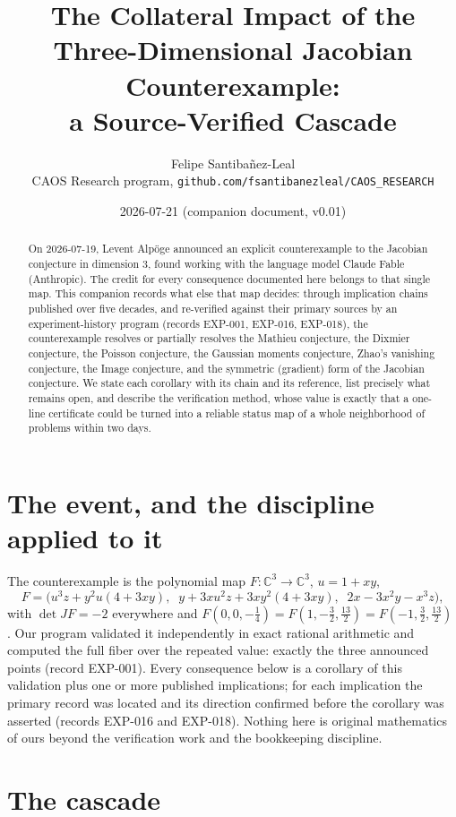 \documentclass[11pt]{article}
\title{The Collateral Impact of the Three-Dimensional Jacobian Counterexample:\\ a Source-Verified Cascade}
\author{Felipe Santiba\~nez-Leal\\
\small CAOS Research program, \texttt{github.com/fsantibanezleal/CAOS\_RESEARCH}}
\date{2026-07-21 (companion document, v0.01)}
\newcommand{\C}{\mathbb{C}}
\begin{document}
\maketitle

\begin{abstract}
On 2026-07-19, Levent Alp\"oge announced an explicit counterexample to the Jacobian conjecture
in dimension 3, found working with the language model Claude Fable (Anthropic). The credit for
every consequence documented here belongs to that single map. This companion records what else
that map decides: through implication chains published over five decades, and re-verified
against their primary sources by an experiment-history program (records EXP-001, EXP-016,
EXP-018), the counterexample resolves or partially resolves the Mathieu conjecture, the Dixmier
conjecture, the Poisson conjecture, the Gaussian moments conjecture, Zhao's vanishing
conjecture, the Image conjecture, and the symmetric (gradient) form of the Jacobian conjecture.
We state each corollary with its chain and its reference, list precisely what remains open, and
describe the verification method, whose value is exactly that a one-line certificate could be
turned into a reliable status map of a whole neighborhood of problems within two days.
\end{abstract}

\section{The event, and the discipline applied to it}

The counterexample is the polynomial map $F : \C^3 \to \C^3$, $u = 1 + xy$,
\[
F = \bigl(u^3 z + y^2 u (4 + 3xy),\;\; y + 3x u^2 z + 3x y^2 (4 + 3xy),\;\; 2x - 3x^2 y - x^3 z\bigr),
\]
with $\det JF = -2$ everywhere and
$F(0, 0, -\tfrac14) = F(1, -\tfrac32, \tfrac{13}{2}) = F(-1, \tfrac32, \tfrac{13}{2})$
\cite{Alpoge2026}. Our program validated it independently in exact rational arithmetic and
computed the full fiber over the repeated value: exactly the three announced points (record
EXP-001). Every consequence below is a corollary of this validation plus one or more published
implications; for each implication the primary record was located and its direction confirmed
before the corollary was asserted (records EXP-016 and EXP-018). Nothing here is original
mathematics of ours beyond the verification work and the bookkeeping discipline.

\section{The cascade}
\end{document}
